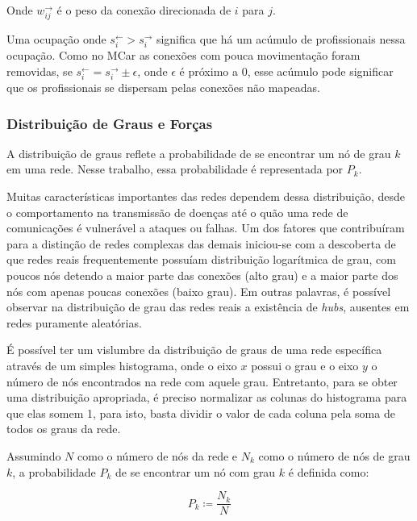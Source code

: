 \documentclass[12pt,a4paper]{article}
\theoremstyle{hypo}
\newcommand{\defn}{\coloneqq} %
\newcommand{\linkin}[1]{#1^\leftarrow} %
\newcommand{\linkout}[1]{#1^\rightarrow} %
\newcommand{\wout}{w^\rightarrow} %
\begin{document}
Onde $\wout_{ij}$ é o peso da conexão direcionada de $i$ para $j$.


Uma ocupação onde $\linkin{s}_i > \linkout{s}_i$ significa que há um acúmulo de profissionais nessa ocupação. Como no MCar as conexões com pouca movimentação foram removidas, se $\linkin{s}_i = \linkout{s}_i \pm \epsilon$, onde $\epsilon$ é próximo a 0, esse acúmulo pode significar que os profissionais se dispersam pelas conexões não mapeadas. 

\subsubsection{Distribuição de Graus e Forças} \label{sec:distribuicao-grau-forca}

A distribuição de graus reflete a probabilidade de se encontrar um nó de grau $k$ em uma rede. Nesse trabalho, essa probabilidade é representada por $P_k$.

Muitas características importantes das redes dependem dessa distribuição, desde o comportamento na transmissão de doenças até o quão uma rede de comunicações é vulnerável a ataques ou falhas. Um dos fatores que contribuíram para a distinção de redes complexas das demais iniciou-se com a descoberta de \cite{Barabasi1999-sn} que redes reais frequentemente possuíam distribuição logarítmica de grau, com poucos nós detendo a maior parte das conexões (alto grau) e a maior parte dos nós com apenas poucas conexões (baixo grau). Em outras palavras, é possível observar na distribuição de grau das redes reais a existência de \textit{hubs}, ausentes em redes puramente aleatórias.

É possível ter um vislumbre da distribuição de graus de uma rede específica através de um simples histograma, onde o eixo $x$ possui o grau e o eixo $y$ o número de nós encontrados na rede com aquele grau. Entretanto, para se obter uma distribuição apropriada, é preciso normalizar as colunas do histograma para que elas somem 1, para isto, basta dividir o valor de cada coluna pela soma de todos os graus da rede.

Assumindo $N$ como o número de nós da rede e $N_k$ como o número de nós de grau $k$, a probabilidade $P_k$ de se encontrar um nó com grau $k$ é definida como:

\begin{equation} \label{eq:probabilidade-grau}
P_k \defn \frac{N_k}{N}
\end{equation}
\end{document}
